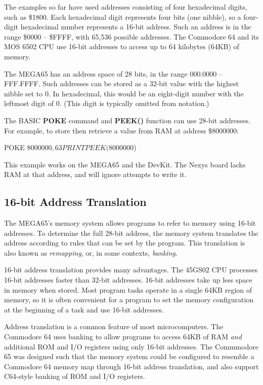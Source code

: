 The examples so far have used addresses consisting of four hexadecimal digits,
such as \$1800. Each hexadecimal digit represents four bits (one nibble), so a four-digit
hexadecimal number represents a 16-bit address. Such an address is in the range
\$0000 -- \$FFFF, with 65,536 possible addresses. The Commodore 64 and its MOS
6502 CPU use 16-bit addresses to access up to 64 kilobytes (64KB) of memory.

The MEGA65 has an address space of 28 bits, in the
range 000.0000 -- FFF.FFFF. Such addresses can be stored as a 32-bit value with
the highest nibble set to 0. In hexadecimal, this would be an
eight-digit number with the leftmost digit of 0. (This digit is typically
omitted from notation.)

The BASIC {\bf POKE} command and {\bf PEEK()} function can use 28-bit
addresses. For example, to store then retrieve a value from RAM at address \$8000000:

\begin{screenoutput}
POKE $8000000,63
PRINT PEEK($8000000)
\end{screenoutput}

This example works on the MEGA65 and the DevKit. The Nexys board lacks RAM
at that address, and will ignore attempts to write it.

\subsection{16-bit Address Translation}

The MEGA65's memory system allows programs to refer to memory using 16-bit
addresses. To determine the full 28-bit address, the memory system translates
the address according to rules that can be set by the program. This translation
is also known as {\em remapping}, or, in some contexts, {\em
banking}.

16-bit address translation provides many advantages. The 45GS02 CPU processes
16-bit addresses faster than 32-bit addresses. 16-bit addresses take up less
space in memory when stored. Most program tasks operate in a single 64KB region
of memory, so it is often convenient for a program to set the memory
configuration at the beginning of a task and use 16-bit addresses.

Address translation is a common feature of most microcomputers. The Commodore
64 uses banking to allow programs to access 64KB of RAM {\em and} additional
ROM and I/O registers using only 16-bit addresses. The Commmodore 65 was
designed such that the memory system could be configured to resemble a
Commodore 64 memory map through 16-bit address translation, and also support
C64-style banking of ROM and I/O registers.

